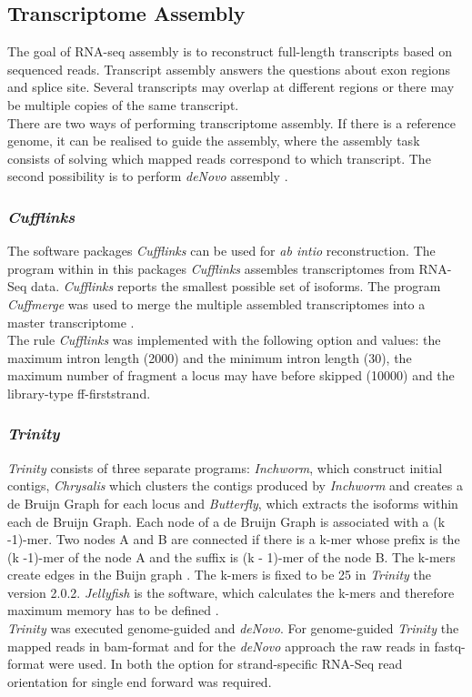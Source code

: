 \documentclass[12pt, a4paper]{report}
\begin{document}
\subsection*{Transcriptome Assembly}
The goal of RNA-seq assembly is to reconstruct full-length transcripts based on sequenced reads. Transcript assembly answers the questions about exon regions and splice site. Several transcripts may overlap at different regions or there may be multiple copies of the same transcript. \\
There are two ways of performing transcriptome assembly. If there is a reference genome, it can be realised to guide the assembly, where the assembly task consists of solving which mapped reads correspond to which transcript. The second possibility is to perform \textit{deNovo} assembly \cite{Korpelainen2014}.  

\subsubsection*{\textit{Cufflinks}}
The software packages \textit{Cufflinks} can be used for \textit{ab intio} reconstruction. The program within in this packages \textit{Cufflinks} assembles transcriptomes from RNA-Seq data. \textit{Cufflinks} reports the smallest possible set of isoforms. The program \textit{Cuffmerge} was used to merge the multiple assembled transcriptomes into a master transcriptome \cite{Trapnell2010}. \\
The rule \textit{Cufflinks} was implemented with the following option and values: the maximum intron length (2000) and the minimum intron length (30), the maximum number of fragment a locus may have before skipped (10000) and the library-type ff-firststrand.

\subsubsection*{\textit{Trinity}}
\textit{Trinity} consists of three separate programs: \textit{Inchworm}, which construct initial contigs, \textit{Chrysalis} which clusters the contigs produced by \textit{Inchworm} and creates a de Bruijn Graph for each locus and \textit{Butterfly}, which extracts the isoforms within each de Bruijn Graph. 
Each node of a de Bruijn Graph is associated with a (k -1)-mer. Two nodes A and B are connected if there is a k-mer whose prefix is the (k -1)-mer of the node A and the suffix is (k - 1)-mer of the node B. The k-mers create edges in the Buijn graph \cite{Korpelainen2014}. The k-mers is fixed to be 25 in \textit{Trinity} the version 2.0.2.
\textit{Jellyfish} is the software, which calculates the k-mers and therefore maximum memory has to be defined \cite{Grabherr2011}. 
\ \\
\textit{Trinity} was executed genome-guided and \textit{deNovo}. For genome-guided \textit{Trinity} the mapped reads in bam-format and for the \textit{deNovo} approach the raw reads in fastq-format were used. In both the option for strand-specific RNA-Seq read orientation for single end forward was required. 
\end{document}
